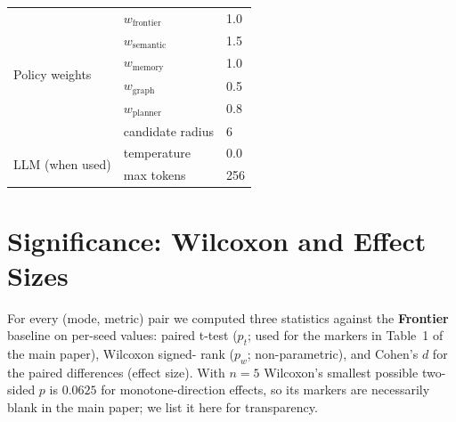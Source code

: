 \documentclass[conference,a4paper,10pt]{IEEEtran}
\begin{document}
\begin{table}[h]
\begin{tabular}{lll}
\multirow{6}{*}{Policy weights} & $w_\mathrm{frontier}$ & 1.0 \\
                                 & $w_\mathrm{semantic}$ & 1.5 \\
                                 & $w_\mathrm{memory}$ & 1.0 \\
                                 & $w_\mathrm{graph}$ & 0.5 \\
                                 & $w_\mathrm{planner}$ & 0.8 \\
                                 & candidate radius & 6 \\
\midrule
\multirow{2}{*}{LLM (when used)} & temperature & 0.0 \\
                                  & max tokens & 256 \\
\bottomrule
\end{tabular}
\end{table}

\section{Significance: Wilcoxon and Effect Sizes}
\label{app:stats}

For every (mode, metric) pair we computed three statistics against the
\textbf{Frontier} baseline on per-seed values: paired t-test ($p_t$;
used for the markers in Table~1 of the main paper), Wilcoxon signed-
rank ($p_w$; non-parametric), and Cohen's $d$ for the paired
differences (effect size). With $n{=}5$ Wilcoxon's smallest possible
two-sided $p$ is $0.0625$ for monotone-direction effects, so its
markers are necessarily blank in the main paper; we list it here for
transparency.
\end{document}
